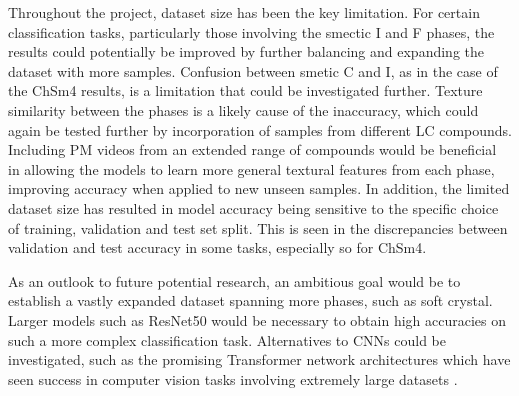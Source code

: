 \documentclass[12pt]{article}
\begin{document}
Throughout the project, dataset size has been the key limitation. For certain classification tasks, particularly those involving the smectic I and F phases, the results could potentially be improved by further balancing and expanding the dataset with more samples. Confusion between smetic C and I, as in the case of the ChSm4 results, is a limitation that could be investigated further. Texture similarity between the phases is a likely cause of the inaccuracy, which could again be tested further by incorporation of samples from different LC compounds. Including PM videos from an extended range of compounds would be beneficial in allowing the models to learn more general textural features from each phase, improving accuracy when applied to new unseen samples. In addition, the limited dataset size has resulted in model accuracy being sensitive to the specific choice of training, validation and test set split. This is seen in the discrepancies between validation and test accuracy in some tasks, especially so for ChSm4.

As an outlook to future potential research, an ambitious goal would be to establish a vastly expanded dataset spanning more phases, such as soft crystal. Larger models such as ResNet50 would be necessary to obtain high accuracies on such a more complex classification task. Alternatives to CNNs could be investigated, such as the promising Transformer network architectures which have seen success in computer vision tasks involving extremely large datasets \cite{Khan2021TransformersIV}.



\appendix
\appendixpage
\end{document}
